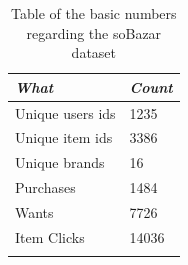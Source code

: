     \begin{table}[H]
        \centering
        \begin{tabular}{l|l}
            \toprule
            \emph{What}        & \emph{Count}   \\ \hline
            Unique users ids   & 1235           \\ \hline
            Unique item ids    & 3386           \\ \hline
            Unique brands      & 16             \\ \hline
            Purchases          & 1484           \\ \hline
            Wants              & 7726           \\ \hline
            Item Clicks        & 14036          \\
            \bottomrule
        \caption[Dataset summary]{Table of the basic numbers regarding the soBazar dataset}
        \label{table:datasetSummary}
        \end{tabular}
    \end{table}



